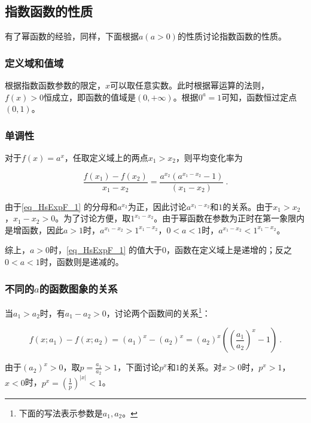 \subsection{指数函数的性质}

有了幂函数的经验，同样，下面根据$a(a>0)$的性质讨论指数函数的性质。

\subsubsection{定义域和值域}

根据指数函数参数的限定，$x$可以取任意实数。此时根据幂运算的法则，$f(x)>0$恒成立，即函数的值域是$(0,+\infty)$。根据$0^a=1$可知，函数恒过定点$(0,1)$。

\subsubsection{单调性}

对于$f(x)=a^x$，任取定义域上的两点$x_1>x_2$，则平均变化率为

\begin{equation}\label{eq_HsExpF_1}
\frac{f(x_1)-f(x_2)}{x_1-x_2}=\frac{a^{x_2}(a^{x_1-x_2}-1)}{(x_1-x_2)}~.
\end{equation}

由于\autoref{eq_HsExpF_1} 的分母和$a^{x_2}$为正，因此讨论$a^{x_1-x_2}$和$1$的关系。由于$x_1>x_2$，$x_1-x_2>0$。为了讨论方便，取$1^{x_1-x_2}$。由于幂函数在参数为正时在第一象限内是增函数，因此$a>1$时，$a^{x_1-x_2}>1^{x_1-x_2}$，$0<a<1$时，$a^{x_1-x_2}<1^{x_1-x_2}$。

综上，$a>0$时，\autoref{eq_HsExpF_1} 的值大于$0$，函数在定义域上是递增的；反之$0<a<1$时，函数则是递减的。

\subsubsection{不同的$a$的函数图象的关系}

当$a_1>a_2$时，有$a_1-a_2>0$，讨论两个函数间的关系\footnote{下面的写法表示参数是$a_1,a_2$。}：

\begin{equation}
f(x;a_1)-f(x;a_2)=(a_1)^x-(a_2)^x=(a_2)^x\left(\left(\frac{a_1}{a_2}\right)^x-1\right)~.
\end{equation}

由于$\displaystyle (a_2)^x>0$，取$p=\frac{a_1}{a_2}>1$，下面讨论$p^x$和$1$的关系。对$x>0$时，$p^x>1$，$x<0$时，$\displaystyle p^x=\left(\frac{1}{p}\right)^{|x|}<1$。

